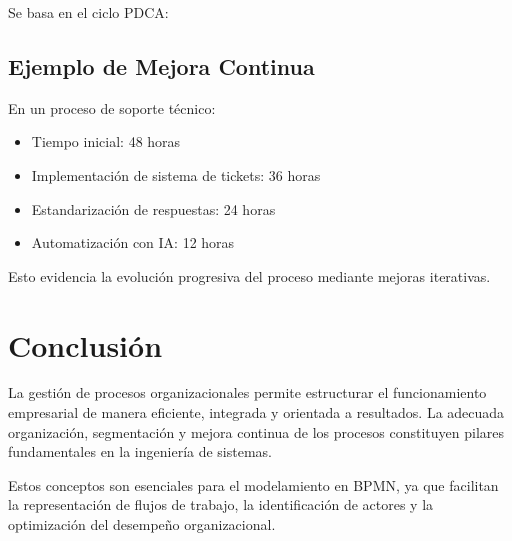 \documentclass[12pt,a4paper]{article}
\begin{document}
Se basa en el ciclo PDCA:

\begin{center}
\end{center}

\subsection{Ejemplo de Mejora Continua}
En un proceso de soporte técnico:

\begin{itemize}
    \item Tiempo inicial: 48 horas
    \item Implementación de sistema de tickets: 36 horas
    \item Estandarización de respuestas: 24 horas
    \item Automatización con IA: 12 horas
\end{itemize}

Esto evidencia la evolución progresiva del proceso mediante mejoras iterativas.

\section{Conclusión}
La gestión de procesos organizacionales permite estructurar el funcionamiento empresarial de manera eficiente, integrada y orientada a resultados. La adecuada organización, segmentación y mejora continua de los procesos constituyen pilares fundamentales en la ingeniería de sistemas.

Estos conceptos son esenciales para el modelamiento en BPMN, ya que facilitan la representación de flujos de trabajo, la identificación de actores y la optimización del desempeño organizacional.
\end{document}

